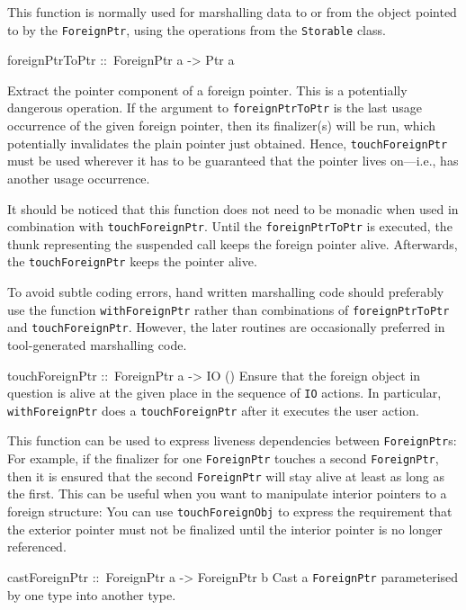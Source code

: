 \documentclass[a4paper,twoside]{article}
\makeatletter
\newcommand{\code}[1]{\texttt{#1}}      %
\newenvironment{codedesc}{%
  \list{}{\labelwidth\z@
    \let\makelabel\codedesclabel}
  }{%
  \endlist
  }
\newcommand*{\codedesclabel}[1]{%
  \hspace{-\leftmargin}
  \parbox[b]{\labelwidth}{\makebox[0pt][l]{\code{#1}}\\}\hfil\relax
  }
\makeatother
\begin{document}
\begin{codedesc}
  This function is normally used for marshalling data to or from the object
  pointed to by the \code{ForeignPtr}, using the operations from the
  \code{Storable} class.

\item[foreignPtrToPtr ::\ ForeignPtr a -> Ptr a]
  
  Extract the pointer component of a foreign pointer. This is a potentially
  dangerous operation.  If the argument to \code{foreignPtrToPtr} is the last
  usage occurrence of the given foreign pointer, then its finalizer(s) will be
  run, which potentially invalidates the plain pointer just obtained.  Hence,
  \code{touchForeignPtr} must be used wherever it has to be guaranteed that
  the pointer lives on---i.e., has another usage occurrence.

  It should be noticed that this function does not need to be monadic when
  used in combination with \code{touchForeignPtr}.  Until the
  \code{foreignPtrToPtr} is executed, the thunk representing the suspended
  call keeps the foreign pointer alive.  Afterwards, the
  \code{touchForeignPtr} keeps the pointer alive.
  
  To avoid subtle coding errors, hand written marshalling code should
  preferably use the function \code{withForeignPtr} rather than combinations
  of \code{foreignPtrToPtr} and \code{touchForeignPtr}. However, the later
  routines are occasionally preferred in tool-generated marshalling code.
  
\item[touchForeignPtr ::\ ForeignPtr a -> IO ()] Ensure that the foreign
  object in question is alive at the given place in the sequence of \code{IO}
  actions. In particular, \code{withForeignPtr} does a \code{touchForeignPtr}
  after it executes the user action.
  
  This function can be used to express liveness dependencies between
  \code{ForeignPtr}s: For example, if the finalizer for one \code{ForeignPtr}
  touches a second \code{ForeignPtr}, then it is ensured that the second
  \code{ForeignPtr} will stay alive at least as long as the first. This can be
  useful when you want to manipulate interior pointers to a foreign structure:
  You can use \code{touchForeignObj} to express the requirement that the
  exterior pointer must not be finalized until the interior pointer is no
  longer referenced.
    
\item[castForeignPtr ::\ ForeignPtr a -> ForeignPtr b] Cast a
  \code{ForeignPtr} parameterised by one type into another type.
\end{codedesc}
\end{document}
